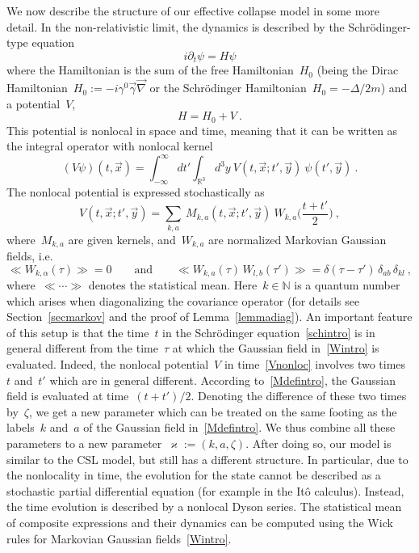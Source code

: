 \documentclass[reqno,11pt]{amsart}
\numberwithin{equation}{section}
\newcommand{\beq}{\begin{equation}}
\newcommand{\eeq}{\end{equation}}
\newcommand{\bbra}{\mathopen{\ll}}
\newcommand{\kket}{\mathclose{\gg}}
\newcommand{\R}{\mathbb{R}}
\newcommand{\1}{\mathds{1}}
\newcommand{\N}{\mathbb{N}}
\begin{document}
We now describe the structure of our effective collapse model in some more detail.
In the non-relativistic limit, the dynamics is described by the Schr\"odinger-type equation
\beq \label{schintro}
i \partial_t \psi = H \psi
\eeq
where the Hamiltonian is the sum of the free Hamiltonian~$H_0$
(being the Dirac Hamiltonian~$H_0 := -i \gamma^0 \vec{\gamma} \vec{\nabla}$ or the
Schr\"odinger Hamiltonian~$H_0 = -\Delta/2m$) and a potential~$V$,
\[ H = H_0 + V \:. \]
This potential is nonlocal in space and time, meaning that it can be written as the integral operator with
nonlocal kernel
\beq \label{Vnonloc}
(V \psi)(t, \vec{x}) = \int_{-\infty}^\infty dt' \int_{\R^3} d^3y \:V(t, \vec{x}; t', \vec{y})\: \psi(t', \vec{y}) \:.
\eeq
The nonlocal potential is expressed stochastically as
\beq \label{Mdefintro}
V(t, \vec{x}; t', \vec{y}) = \sum_{k,a} \: M_{k,a}(t, \vec{x};t', \vec{y})\: W_{k,a}\Big( \frac{t+t'}{2} \Big) \:,
\eeq
where~$M_{k,a}$ are given kernels, and~$W_{k,a}$ are normalized Markovian Gaussian fields, i.e.\
\beq \label{Wintro}
\bbra W_{k,\alpha}(\tau) \kket = 0 \qquad \text{and} \qquad
\bbra W_{k,a}(\tau)\, W_{l,b}(\tau') \kket = \delta(\tau-\tau')\, \delta_{ab} \, \delta_{kl} \:,
\eeq
where~$\bbra \cdots \kket$ denotes the statistical mean.
Here~$k \in \N$ is a quantum number which arises when diagonalizing the covariance operator
(for details see Section~\ref{secmarkov} and the proof of Lemma~\ref{lemmadiag}).
An important feature of this setup is that the time~$t$ in the Schr\"odinger equation~\eqref{schintro}
is in general different from the time~$\tau$ at which the Gaussian field in~\eqref{Wintro} is evaluated.
Indeed, the nonlocal potential~$V$ in time~\eqref{Vnonloc} involves two times~$t$
and~$t'$ which are in general different. According to~\eqref{Mdefintro}, the Gaussian field is evaluated
at time~$(t+t')/2$.
Denoting the difference of these two times by~$\zeta$, we get a new parameter which can be treated
on the same footing as the labels~$k$ and~$a$ of the Gaussian field in~\eqref{Mdefintro}.
We thus combine all these parameters to a new parameter~$\varkappa := (k, a, \zeta)$.
After doing so, our model is similar to the CSL model, but still has a different structure.
In particular, due to the nonlocality in time, the evolution for the state cannot be described
as a stochastic partial differential equation (for example in the It{\^o} calculus).
Instead, the time evolution is described by a nonlocal Dyson series. The statistical mean
of composite expressions and their dynamics can be computed using the Wick rules for
Markovian Gaussian fields~\eqref{Wintro}.
\end{document}
